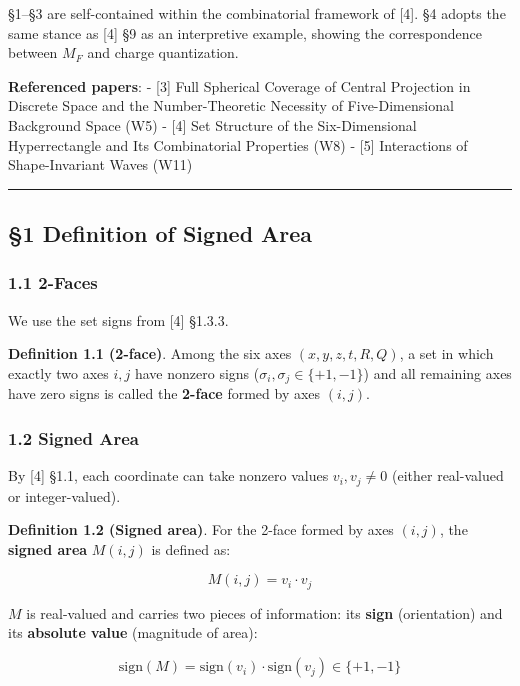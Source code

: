 \documentclass[
  a4paper,11pt]{article}
\begin{document}
§1--§3 are self-contained within the combinatorial framework of {[}4{]}.
§4 adopts the same stance as {[}4{]} §9 as an interpretive example,
showing the correspondence between \(M_F\) and charge quantization.

\textbf{Referenced papers}: - {[}3{]} Full Spherical Coverage of Central
Projection in Discrete Space and the Number-Theoretic Necessity of
Five-Dimensional Background Space (W5) - {[}4{]} Set Structure of the
Six-Dimensional Hyperrectangle and Its Combinatorial Properties (W8) -
{[}5{]} Interactions of Shape-Invariant Waves (W11)

\begin{center}\rule{0.5\linewidth}{0.5pt}\end{center}

\subsection{§1 Definition of Signed
Area}\label{definition-of-signed-area}

\subsubsection{1.1 2-Faces}\label{faces}

We use the set signs from {[}4{]} §1.3.3.

\textbf{Definition 1.1 (2-face)}. Among the six axes
\((x, y, z, t, R, Q)\), a set in which exactly two axes \(i, j\) have
nonzero signs (\(\sigma_i, \sigma_j \in \{+1, -1\}\)) and all remaining
axes have zero signs is called the \textbf{2-face} formed by axes
\((i, j)\).

\subsubsection{1.2 Signed Area}\label{signed-area}

By {[}4{]} §1.1, each coordinate can take nonzero values
\(v_i, v_j \neq 0\) (either real-valued or integer-valued).

\textbf{Definition 1.2 (Signed area)}. For the 2-face formed by axes
\((i, j)\), the \textbf{signed area} \(M(i, j)\) is defined as:

\[M(i, j) = v_i \cdot v_j\]

\(M\) is real-valued and carries two pieces of information: its
\textbf{sign} (orientation) and its \textbf{absolute value} (magnitude
of area):

\[\text{sign}(M) = \text{sign}(v_i) \cdot \text{sign}(v_j) \in \{+1, -1\}\]
\end{document}
